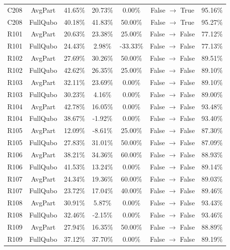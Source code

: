 \documentclass[conference]{IEEEtran}
\begin{document}
\begin{table}[htbp]
{\begin{tabular}{lcccccc}
C208 & AvgPart & 41.65\% & 20.73\% & 0.00\% & False $\to$ True & 95.16\% \\
C208 & FullQubo & 40.18\% & 41.83\% & 50.00\% & False $\to$ True & 95.27\% \\

R101 & AvgPart & 20.63\% & 23.38\% & 25.00\% & False $\to$ False & 77.12\% \\
R101 & FullQubo & 24.43\% & 2.98\% & -33.33\% & False $\to$ False & 77.13\% \\

R102 & AvgPart & 27.69\% & 30.26\% & 50.00\% & False $\to$ False & 89.51\% \\
R102 & FullQubo & 42.62\% & 26.35\% & 25.00\% & False $\to$ False & 89.10\% \\

R103 & AvgPart & 32.11\% & 23.69\% & 0.00\% & False $\to$ False & 89.10\% \\
R103 & FullQubo & 30.23\% & 4.16\% & 0.00\% & False $\to$ False & 89.00\% \\

R104 & AvgPart & 42.78\% & 16.05\% & 0.00\% & False $\to$ False & 93.48\% \\
R104 & FullQubo & 38.67\% & -1.92\% & 0.00\% & False $\to$ False & 93.40\% \\

R105 & AvgPart & 12.09\% & -8.61\% & 25.00\% & False $\to$ False & 87.30\% \\
R105 & FullQubo & 27.83\% & 31.01\% & 50.00\% & False $\to$ False & 87.09\% \\

R106 & AvgPart & 38.21\% & 34.36\% & 60.00\% & False $\to$ False & 88.93\% \\
R106 & FullQubo & 41.53\% & 13.24\% & 0.00\% & False $\to$ False & 89.14\% \\

R107 & AvgPart & 24.34\% & 19.36\% & 60.00\% & False $\to$ False & 89.03\% \\
R107 & FullQubo & 23.72\% & 17.04\% & 40.00\% & False $\to$ False & 89.46\% \\

R108 & AvgPart & 30.91\% & 5.87\% & 0.00\% & False $\to$ False & 93.43\% \\
R108 & FullQubo & 32.46\% & -2.15\% & 0.00\% & False $\to$ False & 93.46\% \\

R109 & AvgPart & 27.94\% & 16.35\% & 50.00\% & False $\to$ False & 88.89\% \\
R109 & FullQubo & 37.12\% & 37.70\% & 0.00\% & False $\to$ False & 89.19\% \\


\end{tabular}}
\end{table}
\end{document}
